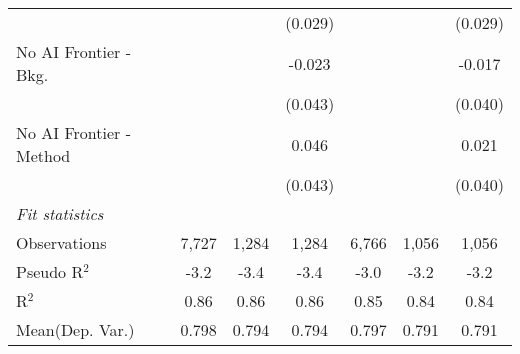 \begin{tabular}{lcccccc}
                           &         &              & (0.029)      &         &              & (0.029)\\   
   No AI Frontier - Bkg.   &         &              & -0.023       &         &              & -0.017\\   
                           &         &              & (0.043)      &         &              & (0.040)\\   
   No AI Frontier - Method &         &              & 0.046        &         &              & 0.021\\   
                           &         &              & (0.043)      &         &              & (0.040)\\   
   \midrule
   \emph{Fit statistics}\\
   Observations            & 7,727   & 1,284        & 1,284        & 6,766   & 1,056        & 1,056\\  
   Pseudo R$^2$            & -3.2    & -3.4         & -3.4         & -3.0    & -3.2         & -3.2\\  
   R$^2$                   & 0.86    & 0.86         & 0.86         & 0.85    & 0.84         & 0.84\\  
Mean(Dep. Var.) & 0.798 & 0.794 & 0.794 & 0.797 & 0.791 & 0.791 \\
   

\end{tabular}

